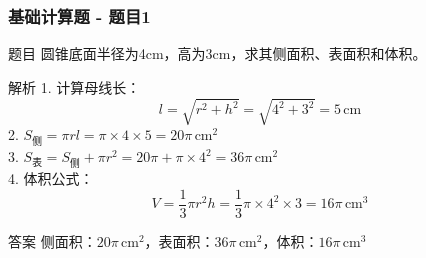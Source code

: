 \begin{frame}
\begin{columns}
    \end{columns}
\end{frame}



\begin{frame}
    \frametitle{基础计算题 - 题目1}
    \begin{block}{题目}
        圆锥底面半径为4cm，高为3cm，求其侧面积、表面积和体积。
    \end{block}
    \pause
    
    \begin{block}{解析}
        1. 计算母线长：
        \[
        l = \sqrt{r^2 + h^2} = \sqrt{4^2 + 3^2} = 5 \, \text{cm}
        \]
        2. 
        \(
        S_{\text{侧}} = \pi r l = \pi \times 4 \times 5 = 20\pi \, \text{cm}^2
        \)\\
        3. 
        \(
        S_{\text{表}} = S_{\text{侧}} + \pi r^2 = 20\pi + \pi \times 4^2 = 36\pi \, \text{cm}^2
        \)\\
        4. 体积公式：
        \[
        V = \frac{1}{3} \pi r^2 h = \frac{1}{3} \pi \times 4^2 \times 3 = 16\pi \, \text{cm}^3
        \]
    \end{block}
    
    \begin{alertblock}{\small 答案}
        \small
        侧面积：\(20\pi \, \text{cm}^2\)，表面积：\(36\pi \, \text{cm}^2\)，体积：\(16\pi \, \text{cm}^3\)
    \end{alertblock}
\end{frame}

